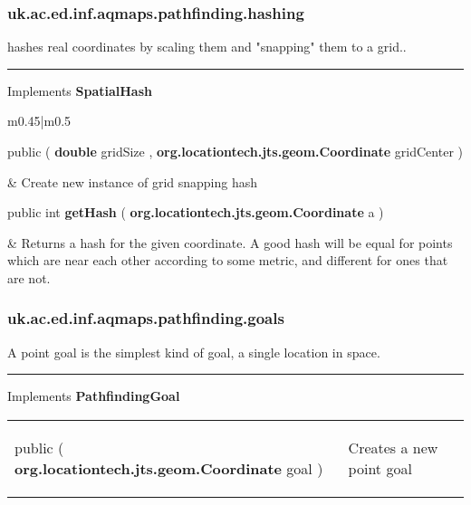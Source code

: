 \subsubsection*{ uk.ac.ed.inf.aqmaps.pathfinding.hashing }
 {\scriptsize hashes real coordinates by scaling them and "snapping" them to a grid..
 
\vspace*{4pt} \hrule \vspace*{3pt}
Implements \textbf{ SpatialHash }
\vspace*{-5pt} 
\begin{tabularx}{\linewidth}{m{0.45\textwidth}|m{0.5\textwidth}}
\label{tab:GridSnappingSpatialHash}
\begin{raggedleft}public  \textbf{\hyperref[tab:GridSnappingSpatialHash]{\color{blue}{GridSnappingSpatialHash}} }(\newline \hfill 
\hspace*{ 5pt} \textbf{double} gridSize , \newline
 \hspace*{ 5pt} \textbf{org.locationtech.jts.geom.Coordinate} gridCenter  )
\end{raggedleft} &
 Create new instance of grid snapping hash\\ \hline 
\begin{raggedleft}public int \textbf{getHash }(\hspace*{ 5pt} \textbf{org.locationtech.jts.geom.Coordinate} a  )
\end{raggedleft} &
 Returns a hash for the given coordinate. A good hash will be equal for points which are near each other\newline%
 according to some metric, and different for ones that are not.\\\end{tabularx}
}
\subsubsection*{ uk.ac.ed.inf.aqmaps.pathfinding.goals }
 {\scriptsize A point goal is the simplest kind of goal, a single location in space.
 
\vspace*{4pt} \hrule \vspace*{3pt}
Implements \textbf{ PathfindingGoal }
\vspace*{-5pt} 
\begin{tabularx}{\linewidth}{m{}|m{}}
\label{tab:PointGoal}
\begin{raggedleft}public  \textbf{\hyperref[tab:PointGoal]{\color{blue}{PointGoal}} }(\hspace*{ 5pt} \textbf{org.locationtech.jts.geom.Coordinate} goal  )
\end{raggedleft} &
 Creates a new point goal\\\end{tabularx}
}
